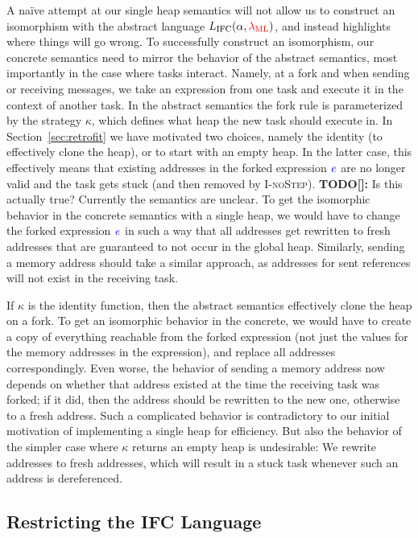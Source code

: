 \documentclass{sigplanconf}
\newcommand{\Varid}[1]{\mathit{#1}}
\newcommand{\Red}[1]{{\color{red} #1}}
\newcommand{\todo}[2]{\Red{\textbf{TODO[}#1\textbf{]:} #2}} %
\begin{document}
A na\"ive attempt at our single heap semantics
will not allow us to construct an isomorphism
with the abstract language \ensuremath{L_\text{IFC}(\alpha,\Red{\lambda_{\text{ML}}})}, and instead highlights
where things will go wrong.
To successfully construct an isomorphism, our concrete semantics need
to mirror the behavior of the abstract semantics, most importantly
in the case where tasks interact.  Namely, at a fork and when sending
or receiving messages, we take an expression from one task and
execute it in the context of another task.  In the abstract semantics
the fork rule is parameterized by the strategy \ensuremath{\kappa}, which defines
what heap the new task should execute in.  \Red{In Section~\ref{sec:retrofit}
we have motivated two choices}, namely the identity (to effectively
clone the heap), or to start with an empty heap.
In the latter case, this effectively means that existing addresses
in the forked expression \ensuremath{\ifc{\Varid{e}}} are no longer valid and the
task gets stuck (and then removed by \textsc{I-noStep}).
\todo{}{Is this actually true?  Currently the semantics are unclear.}
To get the isomorphic behavior in the concrete semantics with a
single heap, we would have to change the forked expression \ensuremath{\ifc{\Varid{e}}} in
such a way that all addresses get rewritten to fresh addresses
that are guaranteed to not occur in the global heap.  Similarly,
sending a memory address should take a similar approach, as addresses
for sent references will not exist in the receiving task.

If \ensuremath{\kappa} is the identity function, then the abstract semantics
effectively clone the heap on a fork.  To get an isomorphic
behavior in the concrete, we would have to create a copy of everything
reachable from the forked expression (not just the values for
the memory addresses in the expression), and replace all addresses
correspondingly.  Even worse, the behavior of sending a memory address
now depends on whether that address existed at the time the receiving
task was forked;  if it did, then the address should be rewritten to the
new one, otherwise to a fresh address.
Such a complicated behavior is contradictory to our initial motivation
of implementing a single heap for efficiency.  But also the
behavior of the simpler case where \ensuremath{\kappa} returns an empty heap is
undesirable:  We rewrite addresses to fresh addresses, which will
result in a stuck task whenever such an address is dereferenced.

\subsection{Restricting the IFC Language}
\end{document}
